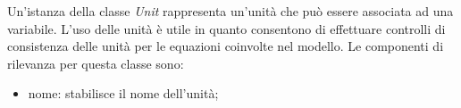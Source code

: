 
Un'istanza della classe \textit{Unit} rappresenta un'unità che può essere associata ad una variabile. L'uso delle unità è utile in quanto consentono di effettuare controlli di consistenza delle unità per le equazioni coinvolte nel modello. Le componenti di rilevanza per questa classe sono:
\begin{itemize}
	\item nome: stabilisce il nome dell'unità;
\end{itemize}